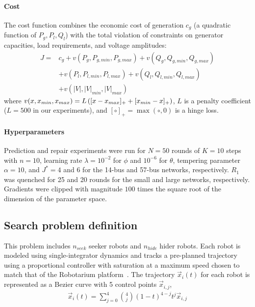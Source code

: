 \paragraph{Cost} The cost function combines the economic cost of generation $c_g$ (a quadratic function of $P_g, P_l, Q_l$) with the total violation of constraints on generator capacities, load requirements, and voltage amplitudes:
\begin{align}
    J = & c_g + v(P_g, P_{g, min}, P_{g, max}) + v(Q_g, Q_{g, min}, Q_{g, max}) \\
        & + v(P_l, P_{l, min}, P_{l, max}) + v(Q_l, Q_{l, min}, Q_{l, max})     \\
        & + v(|V|, |V|_{min}, |V|_{max}) \label{eq:scopf_cost}
\end{align}
where $v(x, x_{min}, x_{max}) = L\left( [x - x_{max}]_+ + [x_{min} - x]_+ \right)$, $L$ is a penalty coefficient ($L=500$ in our experiments), and $[\circ]_+ = \max(\circ, 0)$ is a hinge loss.

\paragraph{Hyperparameters} Prediction and repair experiments were run for $N=50$ rounds of $K=10$ steps with $n=10$, learning rate $\lambda = 10^{-2}$ for $\phi$ and $10^{-6}$ for $\theta$, tempering parameter $\alpha = 10$, and $J^* = 4$ and $6$ for the 14-bus and 57-bus networks, respectively. $R_1$ was quenched for 25 and 20 rounds for the small and large networks, respectively. Gradients were clipped with magnitude $100$ times the square root of the dimension of the parameter space.

\subsection{Search problem definition}

This problem includes $n_{seek}$ seeker robots and $n_{hide}$ hider robots. Each robot is modeled using single-integrator dynamics and tracks a pre-planned trajectory using a proportional controller with saturation at a maximum speed chosen to match that of the Robotarium platform~\cite{wilsonRobotariumGloballyImpactful2020}. The trajectory $\vec{x}_i(t)$ for each robot is represented as a Bezier curve with 5 control points $\vec{x}_{i, j}$,
\begin{align*}
    \vec{x}_i(t) = \sum_{j=0}^4 \binom{4}{j}(1-t)^{4-j}t^j \vec{x}_{i, j}
\end{align*}


